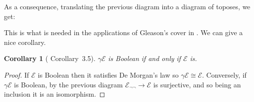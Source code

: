 \documentclass{article}
\newtheorem{corollary}[theorem]{Corollary}
\begin{document}
As a consequence, translating the previous diagram into a diagram of toposes, we get:
\begin{center}
\end{center}

This is what is needed in the applications of Gleason's cover in \cite{harun1996applications}. We can give a nice corollary.

\begin{corollary}[\cite{harun1996applications} Corollary~3.5]
    $\gamma\mathcal{E}$ is Boolean if and only if $\mathcal{E}$ is.
\end{corollary}
\begin{proof}
    If $\mathcal{E}$ is Boolean then it satisfies De Morgan's law so $\gamma\mathcal{E}\cong\mathcal{E}$. Conversely, if $ \gamma\mathcal{E}$ is Boolean, by the previous diagram $\mathcal{E}_{\neg\neg}\xrightarrow{}\mathcal{E}$ is surjective, and so being an inclusion it is an isomorphism.
\end{proof}
\end{document}
